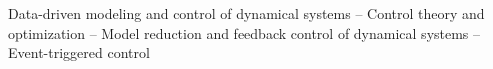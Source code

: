Data-driven modeling and control of dynamical systems -- Control theory and optimization -- Model reduction and feedback control of dynamical systems -- Event-triggered control
